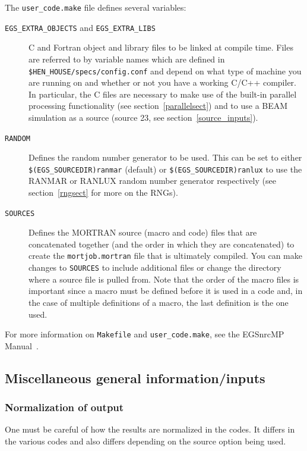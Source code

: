 \documentclass[12pt,twoside]{article}  %
\begin{document}
The {\tt user\_code.make} file defines several variables:
\begin{description}
\item [{\tt EGS\_EXTRA\_OBJECTS} and {\tt EGS\_EXTRA\_LIBS}] C and Fortran
object and library files to be linked at compile time.  Files are referred
to by variable names which are defined in {\tt \$HEN\_HOUSE/specs/config.conf}
and depend on what type of machine you are running on and whether or not you
have a working C/C++ compiler.  In particular, the C files are necessary
to make use of the built-in parallel processing functionality
(see section~\ref{parallelsect}) and to use a BEAM simulation
as a source (source 23, see section~\ref{source_inputs}).
\item [{\tt RANDOM}] Defines the random number generator to be used.  This
can be set to either\\ {\tt \$(EGS\_SOURCEDIR)ranmar} (default) or
{\tt \$(EGS\_SOURCEDIR)ranlux} to use the RANMAR or RANLUX random number
generator respectively (see section~\ref{rngsect} for more on the RNGs).
\item [{\tt SOURCES}] Defines the MORTRAN source (macro and code) files that
are concatenated together (and the order in which they are concatenated)
to create the {\tt mortjob.mortran} file that is ultimately compiled.
You can make changes to {\tt SOURCES} to include additional files or
change the directory where a source file is pulled from.
Note that the order of the macro files is important since a macro
must be defined before it is used in a code and, in the case of multiple
definitions of a macro, the last definition is the one used.
\end{description}

For more information on {\tt Makefile} and {\tt user\_code.make}, see
the EGSnrcMP Manual~\cite{Ka03}.

\subsection{Miscellaneous general information/inputs}

\subsubsection{Normalization of output}
One must be careful of how the results are normalized in the codes. It
differs in the various codes and also differs depending on the source
option being used.
\end{document}
